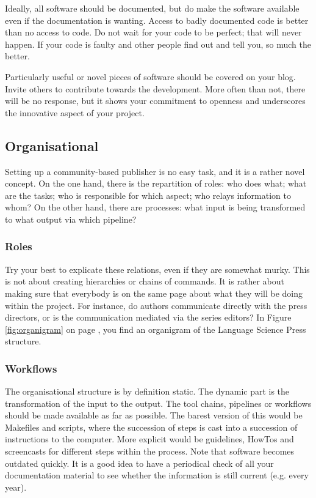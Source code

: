 \documentclass[nonflat,smallfont
]{langsci/langscibook}
\begin{document}
Ideally, all software should be documented, but do make the software available even if the documentation is wanting. Access to badly documented code is better than no access to code. Do not wait for your code to be perfect; that will never happen. If your code is faulty and other people find out and tell you, so much the better.

Particularly useful or novel pieces of software should be covered on your blog. Invite others to contribute towards the development. More often than not, there will be no response, but it shows your commitment to openness and underscores the innovative aspect of your project. 


\subsection{Organisational}
Setting up a community-based publisher is no easy task, and it is a rather novel concept. On the one hand, there is the repartition of roles: who does what; what are the tasks; who is responsible for which aspect; who relays information to whom? On the other hand, there are processes: what input is being transformed to what output via which pipeline?

\subsubsection{Roles}

Try your best to explicate these relations, even if they are somewhat murky. This is not about creating hierarchies or chains of commands. It is rather about making sure that everybody is on the same page about what they will be doing within the project. For instance, do authors communicate directly with the press directors, or is the communication mediated via the series editors? In Figure \ref{fig:organigram} on page \pageref{fig:organigram}, you find an organigram of the Language Science Press structure. 


\subsubsection{Workflows}
The organisational structure is by definition static. The dynamic part is the transformation of the input to the output. The tool chains, pipelines or workflows should be made available as far as possible. The barest version of this would be Makefiles and scripts, where the succession of steps is cast into a succession of instructions to the computer. More explicit would be guidelines, HowTos and screencasts for different steps within the process. Note that software becomes outdated quickly. It is a good idea to have a periodical check of all your documentation material to see whether the information is still current (e.g. every year). 
\end{document}
